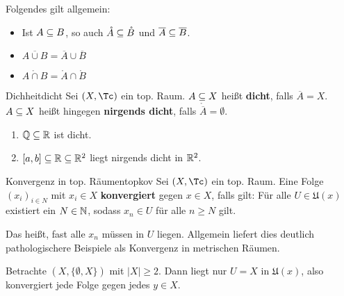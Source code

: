 \begin{bemerkung}
Folgendes gilt allgemein:
\begin{itemize}
\item Ist $A \subseteq B$, so auch $\mathring{A} \subseteq \mathring{B}$ und $\overline{A} \subseteq \overline{B}$.
\item $\overline{A \cup B} = \overline{A} \cup \overline{B}$
\item $\mathring{A \cap B} = \mathring{A} \cap \mathring{B}$
\end{itemize}
\end{bemerkung}
\begin{definition}{Dichheit}{dicht}
Sei $(X, \Tc)$ ein top. Raum. $A \subseteq X$ heißt \textbf{dicht}, falls $\overline{A} = X$. $A\subseteq X$ heißt hingegen \textbf{nirgends dicht}, falls $\mathring{\overline{A}}= \emptyset$.
\end{definition}
\begin{beispiele}
\begin{enumerate}
\item $\mathbb{Q} \subseteq \mathbb{R}$ ist dicht.
\item $[a,b] \subseteq \mathbb{R} \subseteq \mathbb{R}^2$ liegt nirgends dicht in $\mathbb{R}^2$.
\end{enumerate}
\end{beispiele}
\begin{definition}{Konvergenz in top. Räumen}{topkov}
Sei $(X, \Tc)$ ein top. Raum. Eine Folge $(x_i)_{i \in N}$ mit $x_i \in X$ \textbf{konvergiert} gegen $x \in X$, falls gilt:
Für alle $U \in \mathfrak{U}(x)$ existiert ein $N \in \mathbb{N}$, sodass $x_n \in U$ für alle $n \geq N$ gilt.
\end{definition}
Das heißt, fast alle $x_n$ müssen in $U$ liegen. Allgemein liefert dies deutlich pathologischere Beispiele als Konvergenz in metrischen Räumen.
\begin{beispiel}
Betrachte $(X, \{\emptyset, X\})$ mit $|X| \geq 2$. Dann liegt nur $U=X$ in $\mathfrak{U}(x)$, also konvergiert jede Folge gegen jedes $y \in X$.
\end{beispiel}
